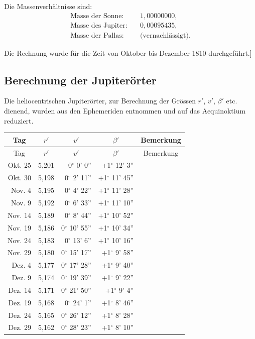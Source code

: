 \documentclass[12pt,a4paper]{article}
\begin{document}
Die Massenverh\"{a}ltnisse sind:
\begin{align*}
\text{Masse der Sonne:} &\quad 1,00000000, \\
\text{Masse des Jupiter:} &\quad 0,00095435, \\
\text{Masse der Pallas:} &\quad \text{(vernachl\"{a}ssigt)}.
\end{align*}

Die Rechnung wurde f\"{u}r die Zeit von Oktober bis Dezember 1810 durchgef\"{u}hrt.]

\newpage
\subsection*{Berechnung der Jupiter\"{o}rter}

Die heliocentrischen Jupiter\"{o}rter, zur Berechnung der Gr\"{o}ssen $r'$, $v'$, $\beta'$ etc. dienend, wurden aus den Ephemeriden entnommen und auf das Aequinoktium reduziert.

\begin{longtable}{|r|r|r|r|r|}
\hline
\multicolumn{1}{|c|}{Tag} & \multicolumn{1}{c|}{$r'$} & \multicolumn{1}{c|}{$v'$} & \multicolumn{1}{c|}{$\beta'$} & \multicolumn{1}{c|}{Bemerkung} \\
\hline
\endfirsthead
\hline
\multicolumn{1}{|c|}{Tag} & \multicolumn{1}{c|}{$r'$} & \multicolumn{1}{c|}{$v'$} & \multicolumn{1}{c|}{$\beta'$} & \multicolumn{1}{c|}{Bemerkung} \\
\hline
\endhead
\hline
\endfoot
1810 Okt. 25 & 5,201 & 0$^\circ$ 0' 0'' & +1$^\circ$ 12' 3'' & \\
Okt. 30 & 5,198 & 0$^\circ$ 2' 11'' & +1$^\circ$ 11' 45'' & \\
Nov. 4 & 5,195 & 0$^\circ$ 4' 22'' & +1$^\circ$ 11' 28'' & \\
Nov. 9 & 5,192 & 0$^\circ$ 6' 33'' & +1$^\circ$ 11' 10'' & \\
Nov. 14 & 5,189 & 0$^\circ$ 8' 44'' & +1$^\circ$ 10' 52'' & \\
Nov. 19 & 5,186 & 0$^\circ$ 10' 55'' & +1$^\circ$ 10' 34'' & \\
Nov. 24 & 5,183 & 0$^\circ$ 13' 6'' & +1$^\circ$ 10' 16'' & \\
Nov. 29 & 5,180 & 0$^\circ$ 15' 17'' & +1$^\circ$ 9' 58'' & \\
Dez. 4 & 5,177 & 0$^\circ$ 17' 28'' & +1$^\circ$ 9' 40'' & \\
Dez. 9 & 5,174 & 0$^\circ$ 19' 39'' & +1$^\circ$ 9' 22'' & \\
Dez. 14 & 5,171 & 0$^\circ$ 21' 50'' & +1$^\circ$ 9' 4'' & \\
Dez. 19 & 5,168 & 0$^\circ$ 24' 1'' & +1$^\circ$ 8' 46'' & \\
Dez. 24 & 5,165 & 0$^\circ$ 26' 12'' & +1$^\circ$ 8' 28'' & \\
Dez. 29 & 5,162 & 0$^\circ$ 28' 23'' & +1$^\circ$ 8' 10'' & \\
\hline
\end{longtable}
\end{document}
